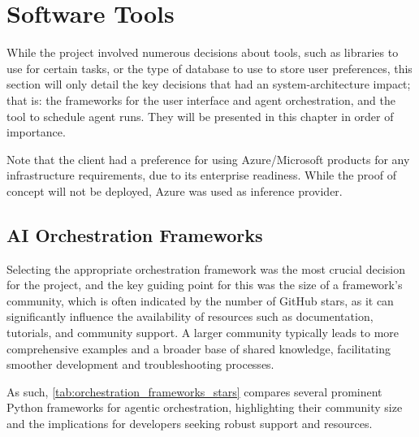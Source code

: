\documentclass[a4paper]{report}
\begin{document}
\section{Software Tools}
\label{sec:research-tools}

While the project involved numerous decisions about tools, such as libraries to use for certain tasks, or the type of database to use to store user preferences, this section will only detail the key decisions that had an system-architecture impact; that is: the frameworks for the user interface and agent orchestration, and the tool to schedule agent runs. They will be presented in this chapter in order of importance.

Note that the client had a preference for using Azure/Microsoft products for any infrastructure requirements, due to its enterprise readiness. While the proof of concept will not be deployed, Azure was used as inference provider. 

\subsection{AI Orchestration Frameworks}

Selecting the appropriate orchestration framework was the most crucial decision for the project, and the key guiding point for this was the size of a framework's community, which is often indicated by the number of GitHub stars, as it can significantly influence the availability of resources such as documentation, tutorials, and community support. A larger community typically leads to more comprehensive examples and a broader base of shared knowledge, facilitating smoother development and troubleshooting processes.

As such, \autoref{tab:orchestration_frameworks_stars} compares several prominent Python frameworks for agentic orchestration, highlighting their community size and the implications for developers seeking robust support and resources.
\end{document}
